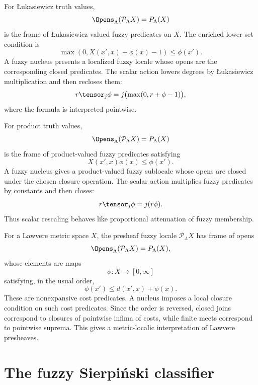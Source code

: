 \begin{example}
\label{ex:lukasiewicz-valued-presheaf-locales}
For {\L}ukasiewicz truth values,
\[
    \Opens_\Lambda(\mathcal P_\Lambda X)
    =
    P_\Lambda(X)
\]
is the frame of {\L}ukasiewicz-valued fuzzy predicates on \(X\). The enriched
lower-set condition is
\[
    \max(0,X(x',x)+\phi(x)-1)\leq \phi(x').
\]
A fuzzy nucleus presents a localized fuzzy locale whose opens are the corresponding
closed predicates. The scalar action lowers degrees by {\L}ukasiewicz multiplication
and then recloses them:
\[
    r\tensor_j\phi
    =
    j\bigl(\max(0,r+\phi-1)\bigr),
\]
where the formula is interpreted pointwise.
\end{example}

\begin{example}
\label{ex:product-valued-presheaf-locales}
For product truth values,
\[
    \Opens_\Lambda(\mathcal P_\Lambda X)
    =
    P_\Lambda(X)
\]
is the frame of product-valued fuzzy predicates satisfying
\[
    X(x',x)\phi(x)\leq \phi(x').
\]
A fuzzy nucleus gives a product-valued fuzzy sublocale whose opens are closed under
the chosen closure operation. The scalar action multiplies fuzzy predicates by
constants and then closes:
\[
    r\tensor_j\phi=j(r\phi).
\]
Thus scalar rescaling behaves like proportional attenuation of fuzzy membership.
\end{example}

\begin{example}
\label{ex:lawvere-valued-presheaf-locales}
For a Lawvere metric space \(X\), the presheaf fuzzy locale \(\mathcal P_\Lambda X\)
has frame of opens
\[
    \Opens_\Lambda(\mathcal P_\Lambda X)=P_\Lambda(X),
\]
whose elements are maps
\[
    \phi:X\to[0,\infty]
\]
satisfying, in the usual order,
\[
    \phi(x')\leq d(x',x)+\phi(x).
\]
These are nonexpansive cost predicates. A nucleus imposes a local closure condition
on such cost predicates. Since the order is reversed, closed joins correspond to
closures of pointwise infima of costs, while finite meets correspond to pointwise
suprema. This gives a metric-localic interpretation of Lawvere presheaves.
\end{example}

\section{The fuzzy Sierpiński classifier}
\label{sec:fuzzy-sierpinski-classifier}

